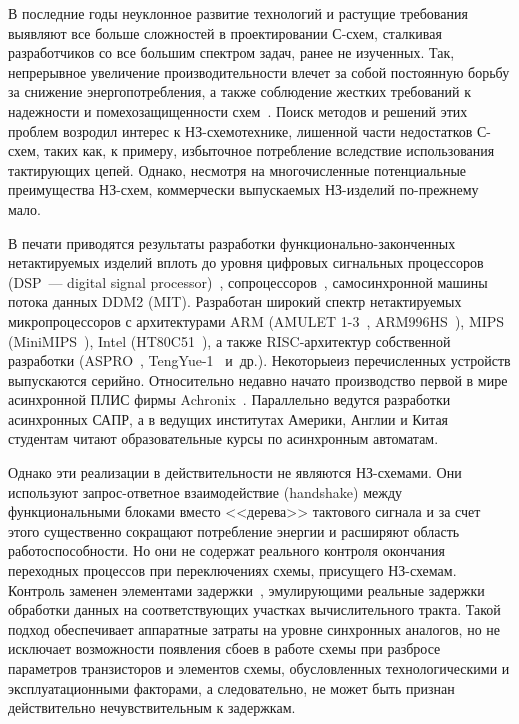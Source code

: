 \begin{multicols}{2}
       В последние годы неуклонное развитие технологий и растущие требования 
выявляют все больше сложностей в проектировании С-схем, сталкивая 
разработчиков со все большим спектром задач, ранее не изученных. Так, непрерывное 
увеличение производительности влечет за собой постоянную борьбу за снижение 
энергопотребления, а также соблюдение жестких требований к надежности и 
помехозащищенности схем~\cite{15-sok}. Поиск методов и решений этих проблем возродил 
интерес к НЗ-схе\-мо\-тех\-ни\-ке, лишенной части недостатков С-схем, таких как, 
к примеру, избыточное потребление вследствие использования тактирующих цепей. Однако, 
несмотря на многочисленные потенциальные преимущества НЗ-схем, коммерчески 
выпускаемых НЗ-изделий по-прежнему мало. 
       
       В печати приводятся результаты разработки функ\-ци\-о\-наль\-но-за\-кон\-чен\-ных 
нетактируемых изделий вплоть до уровня цифровых сигнальных про\-цес\-со\-ров
(DSP~--- digital signal processor)~\cite{15-sok, 16-sok}, 
сопроцессоров~\cite{17-sok}, самосинхронной машины потока данных DDM2 (MIT). 
Разработан широкий спектр нетактируемых микропроцессоров с архитектурами ARM 
(AMULET 1-3~\cite{18-sok}, ARM996HS~\cite{19-sok}), MIPS (MiniMIPS~\cite{20-sok}), 
Intel (HT80C51~\cite{21-sok}), а также RISC-ар\-хи\-тек\-тур собственной разработки 
(\mbox{ASPRO}~\cite{22-sok}, TengYue-1~\cite{23-sok} и~др.). Некоторые\linebreak из перечисленных 
устройств выпускаются серийно. Относительно недавно начато производст\-во первой в мире 
асинхронной ПЛИС фирмы Achronix~\cite{24-sok}. Параллельно ведутся разработки 
асинхронных \mbox{САПР}, а в ведущих институтах Америки, Англии и Китая студентам читают 
образовательные курсы по асинхронным автоматам.
       
       Однако эти реализации в действительности не являются НЗ-схемами. Они 
используют запрос-от\-вет\-ное взаимодействие (handshake) между функциональными 
блоками вместо <<дерева>> тактового\linebreak
 сигнала и за счет этого существенно сокращают 
по\-треб\-ле\-ние энергии и расширяют область работоспособности. Но они не содержат 
реального контроля окончания переходных процессов при переключениях схемы, присущего 
НЗ-схе\-мам. Контроль заменен элементами задержки~\cite{19-sok}, эмулирующими 
реальные задержки обработки данных на соответствующих участках вычислительного 
тракта. Такой подход обеспечивает аппаратные затраты на уровне синхронных аналогов, 
но не исключает возможности появления сбоев в работе схемы при разбросе параметров 
транзисторов и элементов схемы, обусловленных технологическими и эксплуатационными 
факторами, а следовательно, не может быть признан действительно нечувствительным к 
задержкам.
       

\end{multicols}
